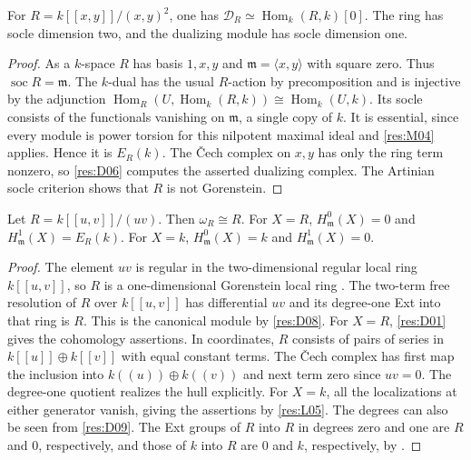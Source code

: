\begin{example}\label{res:E02}
For $R=k[[x,y]]/(x,y)^2$, one has
$\mathcal D_R\simeq\operatorname{Hom}_k(R,k)[0]$.
The ring has socle dimension two, and the dualizing module
has socle dimension one.
\end{example}
\begin{proof}
As a $k$-space $R$ has basis $1,x,y$ and
$\mathfrak m=\langle x,y\rangle$ with square zero.
Thus $\operatorname{soc}R=\mathfrak m$. The $k$-dual has the
usual $R$-action by precomposition and is injective by the
adjunction $\operatorname{Hom}_R(U,\operatorname{Hom}_k(R,k))
\cong\operatorname{Hom}_k(U,k)$. Its socle consists of the
functionals vanishing on $\mathfrak m$, a single copy of $k$.
It is essential, since every module is power torsion for this
nilpotent maximal ideal and \ref{res:M04} applies. Hence it is
$E_R(k)$. The \v{C}ech complex on $x,y$ has only the ring
term nonzero, so \ref{res:D06} computes the asserted dualizing
complex. The Artinian socle criterion
\cite[GC-05--GC-06]{core} shows that $R$ is not Gorenstein.
\end{proof}

\begin{example}\label{res:E03}
Let $R=k[[u,v]]/(uv)$. Then $\omega_R\cong R$. For $X=R$,
$H^0_{\mathfrak m}(X)=0$ and $H^1_{\mathfrak m}(X)=E_R(k)$.
For $X=k$, $H^0_{\mathfrak m}(X)=k$ and $H^1_{\mathfrak m}(X)=0$.
\end{example}
\begin{proof}
The element $uv$ is regular in the two-dimensional regular
local ring $k[[u,v]]$, so $R$ is a one-dimensional Gorenstein
local ring \cite[CM-02 and GC-07]{core}. The two-term free
resolution of $R$ over $k[[u,v]]$ has differential $uv$ and its
degree-one Ext into that ring is $R$. This is the canonical
module by \ref{res:D08}. For $X=R$, \ref{res:D01} gives the
cohomology assertions. In coordinates, $R$ consists of pairs
of series in $k[[u]]\oplus k[[v]]$ with equal constant terms.
The \v{C}ech complex has first map the inclusion into
$k((u))\oplus k((v))$ and next term zero since $uv=0$.
The degree-one quotient realizes the hull explicitly. For
$X=k$, all the localizations at either generator vanish, giving
the assertions by \ref{res:L05}. The degrees can also be seen
from \ref{res:D09}. The Ext groups of $R$ into $R$ in degrees
zero and one are $R$ and $0$, respectively, and those of $k$
into $R$ are $0$ and $k$, respectively, by
\cite[GC-06]{core}.
\end{proof}


